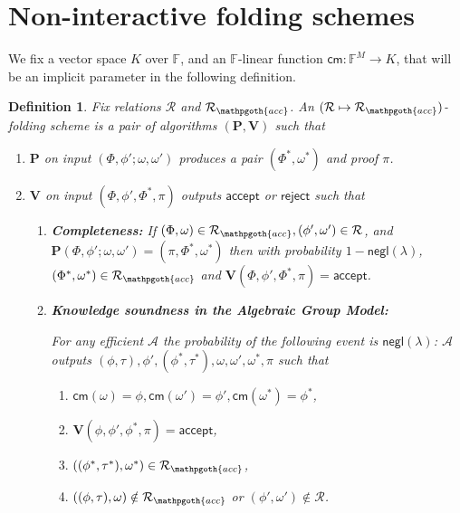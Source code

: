 \documentclass[11pt]{article} %
\newcommand{\F}{\ensuremath{\mathbb F}\xspace}
\newcommand{\adv}{\ensuremath{\mathcal A}\xspace}
\newcommand{\cm}{\ensuremath{\mathsf{cm}}\xspace}
\newcommand{\negl}{\ensuremath{\mathsf{negl}(\lambda)}\xspace}
\newcommand{\rej}{\ensuremath{\mathsf{reject}}\xspace}
\newcommand{\acc}{\ensuremath{\mathsf{accept}}\xspace}
\newcommand{\prv}{\ensuremath{\mathsf{\mathbf{P}}}\xspace}
\newcommand{\prf}{\ensuremath{\mathsf{\pi}}\xspace}
\newcommand{\inst}{\ensuremath{\phi}\xspace}
\newcommand{\wit}{\ensuremath{\mathsf{\omega}}\xspace}
\newcommand{\ver}{\ensuremath{\mathsf{\mathbf{V}}}\xspace}
\newcommand{\rel}{\ensuremath{\mathcal{R}}\xspace}
\newtheorem{dfn}[lemma]{Definition}
\newcommand{\instt}{\ensuremath{\Phi^*}\xspace}
\newcommand{\insttbase}{\ensuremath{\Phi}\xspace}
\newcommand{\accscheme}[2]{$(#1\mapsto #2)$-folding scheme\xspace}
\newcommand{\accrel}{\ensuremath{\rel_{\mathpgoth{acc}}}\xspace}
\newcommand{\inststar}{\ensuremath{\inst^*}\xspace}
\newcommand{\witstar}{\ensuremath{\wit^*}\xspace}
\begin{document}
\section{Non-interactive folding schemes}
We fix a vector space $K$ over \F, and an $\F$-linear function $\cm:\F^M\to K$, that will be an implicit parameter in the following definition.
\begin{dfn}\label{dfn:accschme}
Fix relations \rel and \accrel. An \emph{\accscheme{\rel}{\accrel}} is a pair of algorithms $(\prv, \ver)$
such that

\begin{enumerate}
 \item \prv on input $(\insttbase,\inst';\wit,\wit')$ produces a pair $(\instt,\wit^*)$ and proof \prf .
 \item \ver on input $(\insttbase,\inst',\instt,\prf)$ outputs \acc or \rej such that
\begin{enumerate}
 \item \textbf{Completeness:} If $(\insttbase,\wit)\in \accrel, (\inst',\wit')\in \rel$, and $\prv(\insttbase,\inst';\wit,\wit')=(\prf,\instt,\witstar)$ then with probability $1-\negl$, $(\instt,\witstar)\in \accrel$ and $\ver(\insttbase,\inst',\instt,\prf)=\acc$.
\item \textbf{Knowledge soundness in the Algebraic Group Model:}

For any efficient \adv the probability of the following event is \negl:
\adv outputs $(\inst,\tau),\inst',(\inststar,\tau^*),\wit,\wit',\witstar,\prf$
such that 
\begin{enumerate}
\item $\cm(\wit)=\inst,\cm(\wit')=\inst',\cm(\witstar)=\inststar$, 
\item $\ver(\inst,\inst',\inststar,\prf)=\acc$,
\item $((\inststar,\tau^*),\witstar)\in\accrel$, 
\item $((\inst,\tau),\wit)\notin\accrel$ or $(\inst',\wit')\notin \rel$.
\end{enumerate}

\end{enumerate}
\end{enumerate}
\end{dfn}
\end{document}

